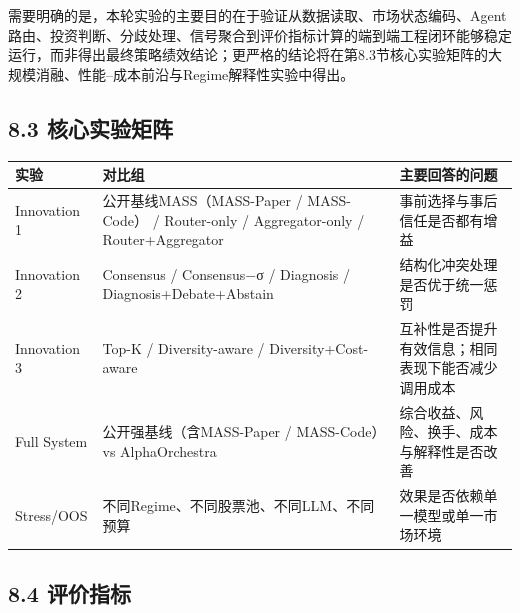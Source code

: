 \documentclass[12pt,a4paper]{ctexart}
\begin{document}
需要明确的是，本轮实验的主要目的在于验证从数据读取、市场状态编码、Agent路由、投资判断、分歧处理、信号聚合到评价指标计算的端到端工程闭环能够稳定运行，而非得出最终策略绩效结论；更严格的结论将在第8.3节核心实验矩阵的大规模消融、性能--成本前沿与Regime解释性实验中得出。

\subsection{\texorpdfstring{\textbf{8.3
核心实验矩阵}}{8.3 核心实验矩阵}}\label{ux6838ux5fc3ux5b9eux9a8cux77e9ux9635}

\begin{longtable}[]{@{}
  >{\raggedright\arraybackslash}p{}
  >{\raggedright\arraybackslash}p{}
  >{\raggedright\arraybackslash}p{}@{}}
\toprule\noalign{}
\begin{minipage}[b]{\linewidth}\centering
\textbf{实验}
\end{minipage} & \begin{minipage}[b]{\linewidth}\centering
\textbf{对比组}
\end{minipage} & \begin{minipage}[b]{\linewidth}\centering
\textbf{主要回答的问题}
\end{minipage} \\
\midrule\noalign{}
\endhead
\bottomrule\noalign{}
\endlastfoot
Innovation 1 & 公开基线MASS（MASS-Paper / MASS-Code） / Router-only /
Aggregator-only / Router+Aggregator & 事前选择与事后信任是否都有增益 \\
Innovation 2 & Consensus / Consensus−σ / Diagnosis /
Diagnosis+Debate+Abstain & 结构化冲突处理是否优于统一惩罚 \\
Innovation 3 & Top-K / Diversity-aware / Diversity+Cost-aware &
互补性是否提升有效信息；相同表现下能否减少调用成本 \\
Full System & 公开强基线（含MASS-Paper / MASS-Code） vs AlphaOrchestra &
综合收益、风险、换手、成本与解释性是否改善 \\
Stress/OOS & 不同Regime、不同股票池、不同LLM、不同预算 &
效果是否依赖单一模型或单一市场环境 \\
\end{longtable}

\subsection{\texorpdfstring{\textbf{8.4
评价指标}}{8.4 评价指标}}\label{ux8bc4ux4ef7ux6307ux6807}
\end{document}
